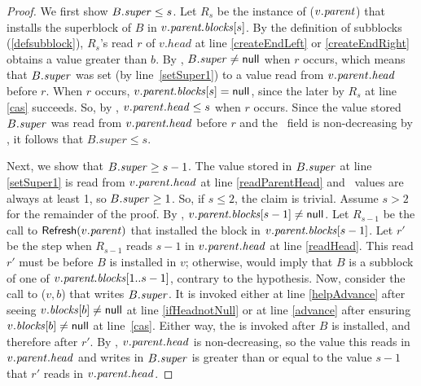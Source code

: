 \superRelationRes*
\begin{proof}
We first show $B.\mbox{\textit{super}}\leq s$.
Let $R_s$ be the instance of ($v.\mbox{\textit{parent}}$) that installs the superblock of $B$ 
in $v.\mbox{\textit{parent.blocks}}[s]$.
By the definition of subblocks (\ref{defsubblock}), $R_s$'s read $r$ of $v.head$ at line \ref{createEndLeft} or \ref{createEndRight} obtains a value greater than $b$.
By , $B.\mbox{\textit{super}} \neq \mbox{\sf null}$ when $r$ occurs, which means
that $B.\mbox{\textit{super}}$ was set (by line~\ref{setSuper1}) to a value read from $v.\mbox{\textit{parent}}.\mbox{\textit{head}}$ before $r$.
When $r$ occurs, $v.\mbox{\textit{parent.blocks}}[s] = \mbox{\sf null}$, since the later  by $R_s$ at line
\ref{cas} succeeds.
So, by , $v.\mbox{\textit{parent}}.\mbox{\textit{head}} \leq s$ when $r$ occurs.
Since the value stored $B.\mbox{\textit{super}}$ was read from $v.\mbox{\textit{parent.head}}$ before $r$ and the \head\ field is non-decreasing by , it follows that $B.super\leq s$.

Next, we show that $B.\mbox{\textit{super}}\geq s-1$.
The value stored in $B.\mbox{\textit{super}}$ at line \ref{setSuper1} is read from $v.\mbox{\textit{parent}}.\mbox{\textit{head}}$ at line \ref{readParentHead} and \head\ values are always at least 1, so $B.\mbox{\textit{super}} \geq 1$.
So, if $s\leq 2$, the claim is trivial.  Assume $s>2$ for the remainder of the proof.
By , $v.\mbox{\textit{parent.blocks}}[s-1]\neq \mbox{\sf null}$.  Let $R_{s-1}$ be the call to
${\sf Refresh}(v.\mbox{\textit{parent}})$ that installed the block in $v.\mbox{\textit{parent.blocks}}[s-1]$.
Let $r'$ be the step when $R_{s-1}$ reads $s-1$ in $v.\mbox{\textit{parent}}.\mbox{\textit{head}}$ at line \ref{readHead}.
This read $r'$ must be before $B$ is installed in $v$;
otherwise,  would imply that $B$ is a subblock of one of 
$v.\mbox{\textit{parent.blocks}}[1..s-1]$, contrary to the hypothesis.
Now, consider the call to ($v, b$) that writes $B.\mbox{\textit{super}}$.
It is invoked either 
at line \ref{helpAdvance} after seeing $v.\mbox{\textit{blocks}}[b]\neq \mbox{\sf null}$ at line \ref{ifHeadnotNull}
or at line \ref{advance} after ensuring $v.\mbox{\textit{blocks}}[b]\neq \mbox{\sf null}$ at line~\ref{cas}.
Either way, the  is invoked after $B$ is installed, and therefore after $r'$.
By , $v.\mbox{\textit{parent}}.\mbox{\textit{head}}$ is non-decreasing, so 
the value this  reads in $v.\mbox{\textit{parent}}.\mbox{\textit{head}}$ and
writes in $B.\mbox{\textit{super}}$ is greater than or equal to the value $s-1$ that $r'$ reads in $v.\mbox{\textit{parent}}.\mbox{\textit{head}}$.
\end{proof}

